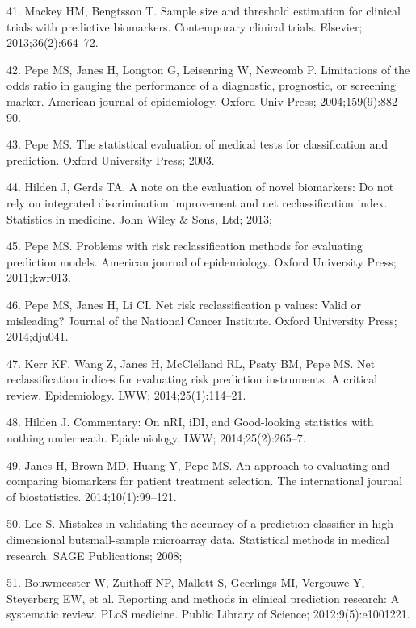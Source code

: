 \documentclass[11pt]{article}
\begin{document}
41. Mackey HM, Bengtsson T. Sample size and threshold estimation for
clinical trials with predictive biomarkers. Contemporary clinical
trials. Elsevier; 2013;36(2):664--72.

42. Pepe MS, Janes H, Longton G, Leisenring W, Newcomb P. Limitations of
the odds ratio in gauging the performance of a diagnostic, prognostic,
or screening marker. American journal of epidemiology. Oxford Univ
Press; 2004;159(9):882--90.

43. Pepe MS. The statistical evaluation of medical tests for
classification and prediction. Oxford University Press; 2003.

44. Hilden J, Gerds TA. A note on the evaluation of novel biomarkers: Do
not rely on integrated discrimination improvement and net
reclassification index. Statistics in medicine. John Wiley \& Sons, Ltd;
2013;

45. Pepe MS. Problems with risk reclassification methods for evaluating
prediction models. American journal of epidemiology. Oxford University
Press; 2011;kwr013.

46. Pepe MS, Janes H, Li CI. Net risk reclassification p values: Valid
or misleading? Journal of the National Cancer Institute. Oxford
University Press; 2014;dju041.

47. Kerr KF, Wang Z, Janes H, McClelland RL, Psaty BM, Pepe MS. Net
reclassification indices for evaluating risk prediction instruments: A
critical review. Epidemiology. LWW; 2014;25(1):114--21.

48. Hilden J. Commentary: On nRI, iDI, and Good-looking statistics
with nothing underneath. Epidemiology. LWW; 2014;25(2):265--7.

49. Janes H, Brown MD, Huang Y, Pepe MS. An approach to evaluating and
comparing biomarkers for patient treatment selection. The international
journal of biostatistics. 2014;10(1):99--121.

50. Lee S. Mistakes in validating the accuracy of a prediction
classifier in high-dimensional butsmall-sample microarray data.
Statistical methods in medical research. SAGE Publications; 2008;

51. Bouwmeester W, Zuithoff NP, Mallett S, Geerlings MI, Vergouwe Y,
Steyerberg EW, et al. Reporting and methods in clinical prediction
research: A systematic review. PLoS medicine. Public Library of Science;
2012;9(5):e1001221.
\end{document}

